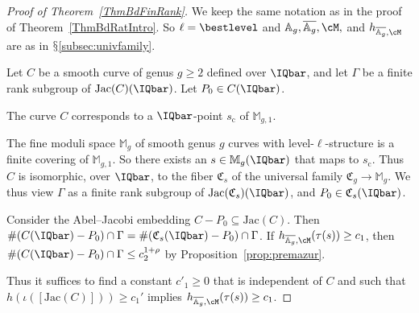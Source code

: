 \begin{proof}[Proof of Theorem~\ref{ThmBdFinRank}]
  We keep the same notation as in the proof of
  Theorem~\ref{ThmBdRatIntro}. So $\ell = \bestlevel$ and
  $\mathbb{A}_g,\overline{\mathbb{A}_g},\cM,$ and
  $h_{\overline{\mathbb{A}_g},\cM}$
  are as in $\mathsection$\ref{subsec:univfamily}.

  Let $C$ be a smooth curve of genus $g\ge 2$ defined over $\IQbar$,
  and let $\Gamma$ be a finite rank subgroup of
  $\mathrm{Jac}(C)(\IQbar)$. Let $P_0 \in C(\IQbar)$.

  The curve $C$
  corresponds to a $\IQbar$-point $s_{\mathrm{c}}$ of
  $\mathbb{M}_{g,1}$.%


  The fine moduli space $\mathbb{M}_g$ of smooth genus $g$ curves
  with level-$\ell$-structure is a finite covering of $\mathbb{M}_{g,1}$. So there exists an $s \in \mathbb{M}_g(\IQbar)$
  that maps to $s_{\mathrm{c}}$. Thus $C$ is isomorphic, over $\IQbar$, to the fiber $\mathfrak{C}_s$ of the universal family
  $\mathfrak{C}_g\rightarrow\mathbb{M}_g$. We thus view $\Gamma$ as a
  finite rank subgroup of $\mathrm{Jac}(\mathfrak{C}_s)(\IQbar)$, and
  $P_0 \in \mathfrak{C}_s(\IQbar)$.

  Consider the Abel--Jacobi embedding $C-P_0 \subseteq
  \mathrm{Jac}(C)$. Then $\# (C(\IQbar)-P_0) \cap \Gamma = \#
  (\mathfrak{C}_s(\IQbar) - P_0)\cap \Gamma$. If $h_{\overline{\mathbb{A}_g},\cM}(\tau(s)) \ge c_1$, then $\# (C(\IQbar)-P_0) \cap \Gamma \le c_2^{1+\rho}$
  by Proposition~\ref{prop:premazur}. %

  Thus it suffices to find a constant $c'_1\ge 0$ that is independent
  of $C$ and such %
  that $h(\iota([\mathrm{Jac}(C)])) \ge c_1'$ implies
  $h_{\overline{\mathbb{A}_g},\cM}(\tau(s)) \ge c_1$.


\end{proof}
